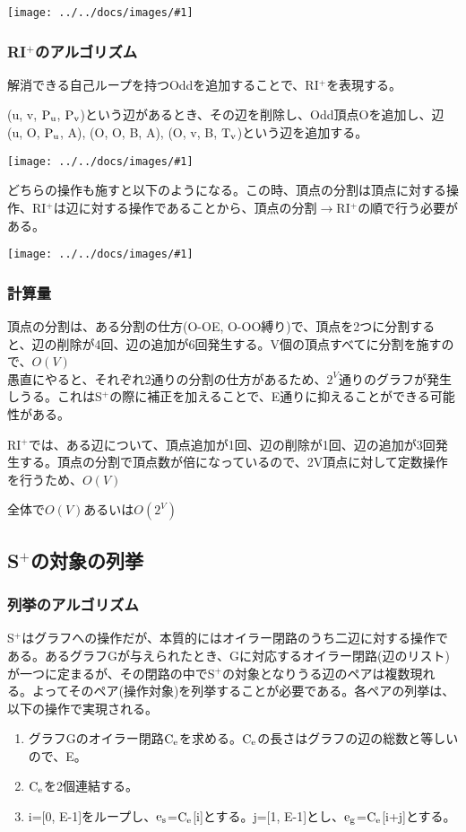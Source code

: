 \documentclass[11pt,a4j]{jarticle}
\newcommand{\splus}{S${}^\text{+}$}
\newcommand{\riplus}{RI${}^\text{+}$}
\newcommand{\f}[1]{$\rm{#1}$} %
\newcommand{\image}[1]{\begin{center}\texttt{[image: ../../docs/images/\#1]}\end{center}}
\newcommand{\ra }{$\rightarrow$}
\begin{document}
\image{extend_split.jpg}

\subsubsection{\riplus のアルゴリズム}
解消できる自己ループを持つOddを追加することで、\riplus を表現する。

(u, v, \f{P_u}, \f{P_v})という辺があるとき、その辺を削除し、Odd頂点Oを追加し、辺(u, O, \f{P_u}, A), (O, O, B, A), (O, v, B, \f{T_v})という辺を追加する。

\image{extend_riplus.jpg}

どちらの操作も施すと以下のようになる。この時、頂点の分割は頂点に対する操作、\riplus は辺に対する操作であることから、頂点の分割\ra \riplus の順で行う必要がある。
\image{extend_total.jpg}

\subsubsection{計算量}
頂点の分割は、ある分割の仕方(O-OE, O-OO縛り)で、頂点を2つに分割すると、辺の削除が4回、辺の追加が6回発生する。V個の頂点すべてに分割を施すので、$O(V)$\\
愚直にやると、それぞれ2通りの分割の仕方があるため、$2^V$通りのグラフが発生しうる。これは\splus の際に補正を加えることで、E通りに抑えることができる可能性がある。

\riplus では、ある辺について、頂点追加が1回、辺の削除が1回、辺の追加が3回発生する。頂点の分割で頂点数が倍になっているので、2V頂点に対して定数操作を行うため、$O(V)$

全体で$O(V)$あるいは$O(2^V)$

\subsection{\splus の対象の列挙}
\label{enum}
\subsubsection{列挙のアルゴリズム}
\splus はグラフへの操作だが、本質的にはオイラー閉路のうち二辺に対する操作である。あるグラフGが与えられたとき、Gに対応するオイラー閉路(辺のリスト)が一つに定まるが、その閉路の中で\splus の対象となりうる辺のペアは複数現れる。よってそのペア(操作対象)を列挙することが必要である。各ペアの列挙は、以下の操作で実現される。

\begin{enumerate}
    \item グラフGのオイラー閉路\f{C_e}を求める。\f{C_e}の長さはグラフの辺の総数と等しいので、E。
    \item \f{C_e}を2個連結する。
    \item i=[0, E-1]をループし、\f{e_s}=\f{C_e}[i]とする。j=[1, E-1]とし、\f{e_g}=\f{C_e}[i+j]とする。
\end{enumerate}
\end{document}
